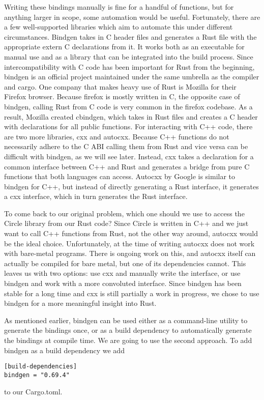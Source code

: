 Writing these bindings manually is fine for a handful of functions, but for anything larger in scope, some automation would be useful.
Fortunately, there are a few well-supported libraries which aim to automate this under different circumstances.
Bindgen takes in C header files and generates a Rust file with the appropriate extern C declarations from it.
It works both as an executable for manual use and as a library that can be integrated into the build process.
Since intercompatibility with C code has been important for Rust from the beginning,
bindgen is an official project maintained under the same umbrella as the compiler and cargo.
One company that makes heavy use of Rust is Mozilla for their Firefox browser.
Because firefox is mostly written in C, the opposite case of bindgen, calling Rust from C code is very common in the firefox codebase.
As a result, Mozilla created cbindgen, which takes in Rust files and creates a C header with declarations for all public functions.
For interacting with C++ code, there are two more libraries, cxx and autocxx.
Because C++ functions do not necessarily adhere to the C ABI calling them from Rust and vice versa can be difficult with bindgen, as we will see later.
Instead, cxx takes a declaration for a common interface between C++ and Rust and generates a bridge from pure C functions that both languages can access.
Autocxx by Google is similar to bindgen for C++, but instead of directly generating a Rust interface, it generates a cxx interface, which in turn generates the Rust interface.

To come back to our original problem, which one should we use to access the Circle library from our Rust code?
Since Circle is written in C++ and we just want to call C++ functions from Rust, not the other way around, autocxx would be the ideal choice.
Unfortunately, at the time of writing autocxx does not work with bare-metal programs.
There is ongoing work on this, and autocxx itself can actually be compiled for bare metal, but one of its dependencies cannot.
This leaves us with two options: use cxx and manually write the interface, or use bindgen and work with a more convoluted interface.
Since bindgen has been stable for a long time and cxx is still partially a work in progress, we chose to use bindgen for a more meaningful insight into Rust.

As mentioned earlier, bindgen can be used either as a command-line utility to generate the bindings once,
or as a build dependency to automatically generate the bindings at compile time.
We are going to use the second approach.
To add bindgen as a build dependency we add
\begin{verbatim}
[build-dependencies]
bindgen = "0.69.4"
\end{verbatim}
to our Cargo.toml.

